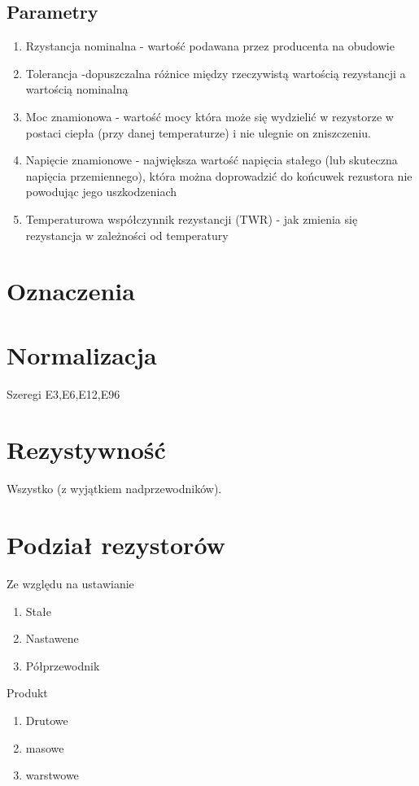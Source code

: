 \documentclass[11pt]{article}
\begin{document}
\subsection{Parametry}
\begin{enumerate}
\item{Rzystancja nominalna - wartość podawana przez producenta na obudowie}
\item{Tolerancja -dopuszczalna różnice między rzeczywistą wartością rezystancji a wartością nominalną}
\item{Moc znamionowa - wartość mocy która może się wydzielić w rezystorze w postaci ciepła (przy danej temperaturze) i nie ulegnie on zniszczeniu.}
\item{Napięcie znamionowe - największa wartość napięcia stałego (lub skuteczna napięcia przemiennego), która można doprowadzić do końcuwek rezustora nie powodując jego uszkodzeniach}
\item{Temperaturowa współczynnik rezystancji (TWR) - jak zmienia się rezystancja w zależności od temperatury} 
\end{enumerate}



\section{Oznaczenia}

\section{Normalizacja}
Szeregi E3,E6,E12,E96

\section{Rezystywność}
Wszystko (z wyjątkiem nadprzewodników).

\section{Podział rezystorów}
Ze względu na ustawianie
\begin{enumerate}
\item{Stałe}
\item{Nastawene}
\item{Półprzewodnik}
\end{enumerate}
Produkt
\begin{enumerate}
\item{Drutowe}
\item{masowe}
\item{warstwowe}
\end{enumerate}
\end{document}

